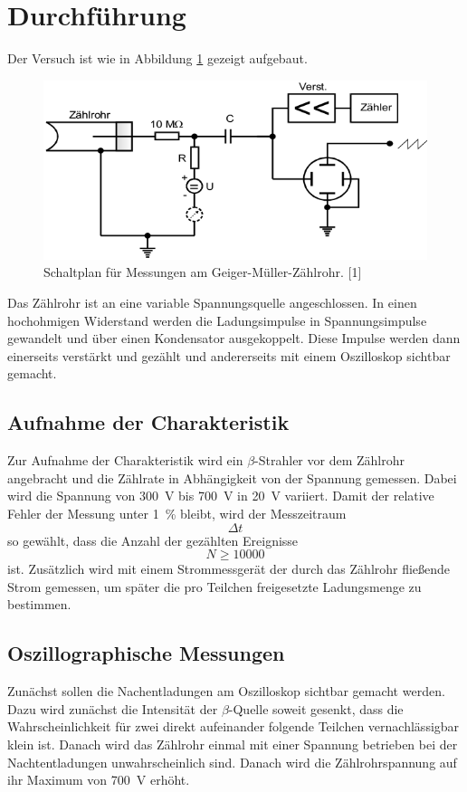 \documentclass[11pt,ngerman,a4paper]{article}
\begin{document}
\section{Durchführung}
Der Versuch ist wie in Abbildung \ref{abb4} gezeigt aufgebaut.
\begin{figure}[htp]
\centering
\includegraphics[scale=0.5]{abb4.png}
\caption{Schaltplan für Messungen am Geiger-Müller-Zählrohr. [1]}
\label{abb4}
\end{figure}
Das Zählrohr ist an eine variable Spannungsquelle angeschlossen. In einen hochohmigen Widerstand werden die Ladungsimpulse in Spannungsimpulse gewandelt und über einen Kondensator ausgekoppelt. Diese Impulse werden dann einerseits verstärkt und gezählt und andererseits mit einem Oszilloskop sichtbar gemacht.
\subsection{Aufnahme der Charakteristik}
Zur Aufnahme der Charakteristik wird ein $\beta$-Strahler vor dem Zählrohr angebracht und die Zählrate in Abhängigkeit von der Spannung gemessen. Dabei wird die Spannung von \SI{300}{\volt} bis \SI{700 }{\volt} in \SI{20}{\volt} variiert. Damit der relative Fehler der Messung unter \SI{1}{\percent} bleibt, wird der Messzeitraum
\[
\Delta t
\]
so gewählt, dass die Anzahl der gezählten Ereignisse
\[
N \geq \num{10000}
\]
ist. Zusätzlich wird mit einem Strommessgerät der durch das Zählrohr fließende Strom gemessen, um später die pro Teilchen freigesetzte Ladungsmenge zu bestimmen. 
\subsection{Oszillographische Messungen}
Zunächst sollen die Nachentladungen am Oszilloskop sichtbar gemacht werden. Dazu wird zunächst die Intensität der $\beta$-Quelle soweit gesenkt, dass die Wahrscheinlichkeit für zwei direkt aufeinander folgende Teilchen vernachlässigbar klein ist. Danach wird das Zählrohr einmal mit einer Spannung betrieben bei der Nachtentladungen unwahrscheinlich sind. Danach wird die Zählrohrspannung auf ihr Maximum von \SI{700}{\volt} erhöht.
\end{document}
